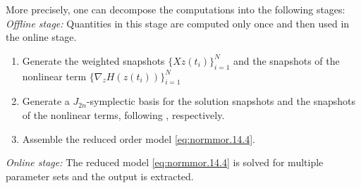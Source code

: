 More precisely, one can decompose the computations into the following stages:
\emph{Offline stage:} Quantities in this stage are computed only once and then used in the online stage.
\begin{enumerate}
\item Generate the weighted snapshots $\{ X z(t_i) \}_{i=1}^N$ and the snapshots of the nonlinear term $\{\nabla_zH(z(t_i))\}_{i=1}^N$
\item Generate a $J_{2n}$-symplectic basis for the solution snapshots and the snapshots of the nonlinear terms, following , respectively.
\item Assemble the reduced order model \cref{eq:normmor.14.4}.
\end{enumerate}
\emph{Online stage:} The reduced model \cref{eq:normmor.14.4} is solved for multiple parameter sets and the output is extracted.
